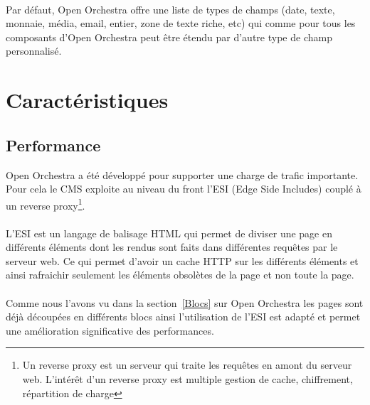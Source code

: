           \paragraph{}
          Par défaut, Open Orchestra offre une liste de types de champs (date, texte, monnaie, média, email, entier, zone de texte riche, etc) qui comme pour tous les composants d'Open Orchestra peut être étendu par d'autre type de champ personnalisé. 
\section{Caractéristiques}
   \subsection{Performance}
   Open Orchestra a été développé pour supporter une charge de trafic importante. Pour cela le CMS exploite au niveau du front l'ESI (Edge Side Includes) couplé à un reverse proxy\footnote{Un reverse proxy est un serveur qui traite les requêtes en amont du serveur web. L'intérêt d'un reverse proxy est multiple gestion de cache, chiffrement, répartition de charge}.
   \paragraph{}
   L'ESI est un langage de balisage HTML qui permet de diviser une page en différents éléments dont les rendus sont faits dans différentes requêtes par le serveur web. Ce qui permet d'avoir un cache HTTP sur les différents éléments et ainsi rafraichir seulement les éléments obsolètes de la page et non toute la page.
   \paragraph{}
   Comme nous l'avons vu dans la section~\ref{Blocs} sur Open Orchestra les pages sont déjà découpées en différents blocs ainsi l'utilisation de l'ESI est adapté et permet une amélioration significative des performances.
